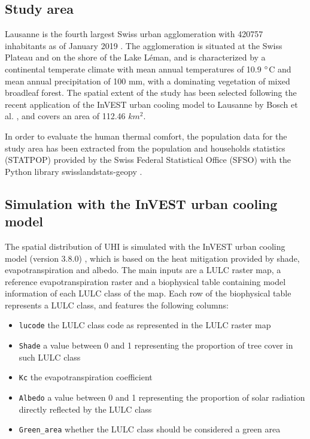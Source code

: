 \documentclass[10pt,letterpaper]{article}
\begin{document}
\subsection*{Study area}

Lausanne is the fourth largest Swiss urban agglomeration with 420757 inhabitants as of January 2019 \cite{sfso2018city}. The agglomeration is situated at the Swiss Plateau and on the shore of the Lake L\'eman, and is characterized by a continental temperate climate with mean annual temperatures of 10.9 $\degree$C and mean annual precipitation of 100 mm, with a dominating vegetation of mixed broadleaf forest. The spatial extent of the study has been selected following the recent application of the InVEST urban cooling model to Lausanne by Bosch et al. \cite{bosch2020spatially}, and covers an area of 112.46 $km^2$.

In order to evaluate the human thermal comfort, the population data for the study area has been extracted from the population and households statistics (STATPOP) \cite{sfso2020statistique} provided by the Swiss Federal Statistical Office (SFSO) with the Python library swisslandstats-geopy \cite{bosch2019swisslandstats}.


\subsection*{Simulation with the InVEST urban cooling model}

The spatial distribution of UHI is simulated with the InVEST urban cooling model (version 3.8.0) \cite{sharp2020invest}, which is based on the heat mitigation provided by shade, evapotranspiration and albedo. The main inputs are a LULC raster map, a reference evapotranspiration raster and a biophysical table containing model information of each LULC class of the map. Each row of the biophysical table represents a LULC class, and features the following columns:

\begin{itemize}
\item \texttt{lucode} the LULC class code as represented in the LULC raster map
\item \texttt{Shade} a value between 0 and 1 representing the proportion of tree cover in such LULC class
\item \texttt{Kc} the evapotranspiration coefficient
\item \texttt{Albedo} a value between 0 and 1 representing the proportion of solar radiation directly reflected by the LULC class
\item \texttt{Green\_area} whether the LULC class should be considered a green area
\end{itemize}
\end{document}
